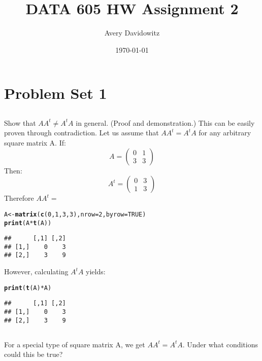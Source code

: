 \documentclass {article}\usepackage[]{graphicx}\usepackage[]{xcolor}
\title {DATA 605 HW Assignment 2}
\author{Avery Davidowitz}
\date{\today}
\makeatletter
\newcommand{\hlnum}[1]{\textcolor[rgb]{0.686,0.059,0.569}{#1}}%
\newcommand{\hlopt}[1]{\textcolor[rgb]{0,0,0}{#1}}%
\newcommand{\hlstd}[1]{\textcolor[rgb]{0.345,0.345,0.345}{#1}}%
\newcommand{\hlkwb}[1]{\textcolor[rgb]{0.69,0.353,0.396}{#1}}%
\newcommand{\hlkwc}[1]{\textcolor[rgb]{0.333,0.667,0.333}{#1}}%
\newcommand{\hlkwd}[1]{\textcolor[rgb]{0.737,0.353,0.396}{\textbf{#1}}}%
\newenvironment{kframe}{%
 \def\at@end@of@kframe{}%
 \ifinner\ifhmode%
  \def\at@end@of@kframe{\end{minipage}}%
  \begin{minipage}{\columnwidth}%
 \fi\fi%
 \def\FrameCommand##1{\hskip\@totalleftmargin \hskip-\fboxsep
 \colorbox{shadecolor}{##1}\hskip-\fboxsep
     \hskip-\linewidth \hskip-\@totalleftmargin \hskip\columnwidth}%
 \MakeFramed {\advance\hsize-\width
   \@totalleftmargin\z@ \linewidth\hsize
   \@setminipage}}%
 {\par\unskip\endMakeFramed%
 \at@end@of@kframe}
\newenvironment{knitrout}{}{} %
\makeatother
\begin{document}
\maketitle


\section{Problem Set 1}
\subsection{} Show that $AA^{t}\neq A^{t}A$ in general. (Proof and demonstration.)
This can be easily proven through contradiction. Let us assume that $AA^{t}=A^{t}A$ for any arbitrary square matrix A.
If:
\[A = \left( \begin{array}{ccc}
0 & 1 \\
3 & 3 \end{array} \right)\] 
Then: 
\[A^{t}= \left( \begin{array}{ccc}
0 & 3 \\
1 & 3 \end{array} \right)\]
Therefore $AA^{t}=$
\begin{knitrout}
\color{fgcolor}\begin{kframe}
\begin{alltt}
\hlstd{A} \hlkwb{<-} \hlkwd{matrix}\hlstd{(}\hlkwd{c}\hlstd{(}\hlnum{0}\hlstd{,}\hlnum{1}\hlstd{,}\hlnum{3}\hlstd{,}\hlnum{3}\hlstd{),} \hlkwc{nrow}\hlstd{=}\hlnum{2}\hlstd{,} \hlkwc{byrow}\hlstd{=}\hlnum{TRUE}\hlstd{)}
\hlkwd{print}\hlstd{(A} \hlopt{*} \hlkwd{t}\hlstd{(A))}
\end{alltt}
\begin{verbatim}
##      [,1] [,2]
## [1,]    0    3
## [2,]    3    9
\end{verbatim}
\end{kframe}
\end{knitrout}
However, calculating $A^{t}A$ yields:
\begin{knitrout}
\color{fgcolor}\begin{kframe}
\begin{alltt}
\hlkwd{print}\hlstd{(}\hlkwd{t}\hlstd{(A)} \hlopt{*} \hlstd{A)}
\end{alltt}
\begin{verbatim}
##      [,1] [,2]
## [1,]    0    3
## [2,]    3    9
\end{verbatim}
\end{kframe}
\end{knitrout}
\subsection{} For a special type of square matrix A, we get $AA^{t}=A^{t}A$. Under what conditions could this be true?
\end{document}
